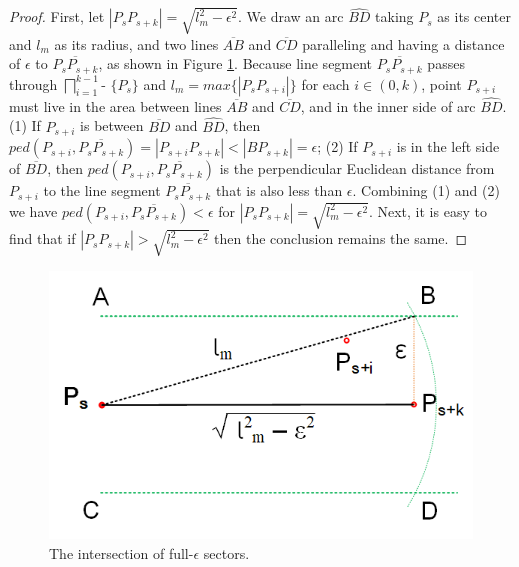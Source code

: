 \begin{proof}
First, let $|P_sP_{s+k}| = \sqrt{l_m^2 - \epsilon^2}$. We draw an arc $\widehat{BD}$ taking $P_s$ as its center and $l_m$ as its radius, and two lines $\overline{AB}$ and $\overline{CD}$ paralleling and having a distance of $\epsilon$ to $\overline{P_sP_{s+k}}$, as shown in Figure \ref{fig:sectorinter}.
Because line segment $\overline{P_sP_{s+k}}$ passes through $\bigsqcap_{i=1}^{k-1}$- $\{P_s\}$ and $l_{m} = max\{|P_sP_{s+i}|\}$ for each $i \in (0, k)$, point $P_{s+i}$ must live in the area between lines $\overline{AB}$ and $\overline{CD}$, and in the inner side of arc $\widehat{BD}$.
(1) If $P_{s+i}$ is between $\overline{BD}$ and $\widehat{BD}$, then $ped(P_{s+i}, \overline{P_sP_{s+k}}) = |{P_{s+i}P_{s+k}}| < |{BP_{s+k}}| = \epsilon$; 
(2) If $P_{s+i}$ is in the left side of $\overline{BD}$, then  $ped(P_{s+i}, \overline{P_sP_{s+k}})$ is the perpendicular Euclidean distance from $P_{s+i}$ to the line segment $\overline{P_sP_{s+k}}$ that is also less than $\epsilon$. Combining (1) and (2) we have $ped(P_{s+i}, \overline{P_sP_{s+k}})< \epsilon$ for $|P_sP_{s+k}| = \sqrt{l_m^2 - \epsilon^2}$.
Next, it is easy to find that if $|P_sP_{s+k}| > \sqrt{l_m^2 - \epsilon^2}$ then the conclusion remains the same.
\end{proof}

\begin{figure}[tb!]
	\centering
	\includegraphics[scale=1.0]{figures/Fig-SectorInter.png}
	\vspace{-2ex}
	\caption{\small The intersection of full-$\epsilon$ sectors.  }
	\vspace{-1ex}
	\label{fig:sectorinter}
\end{figure}

